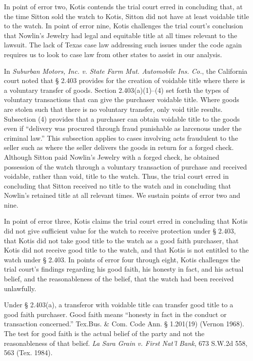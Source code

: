 In point of error two, Kotis contends the trial court erred in concluding that,
at the time Sitton sold the watch to Kotis, Sitton did not have at least
voidable title to the watch. In point of error nine, Kotis challenges the trial
court's conclusion that Nowlin's Jewelry had legal and equitable title at all
times relevant to the lawsuit. The lack of Texas case law addressing such
issues under the code again requires us to look to case law from other states
to assist in our analysis.

In \textit{Suburban Motors, Inc. v. State Farm Mut. Automobile Ins. Co.}, the
California court noted that {\S} 2.403 provides for the creation of voidable
title where there is a voluntary transfer of goods. Section 2.403(a)(1)--(4) set
forth the types of voluntary transactions that can give the purchaser voidable
title. Where goods are stolen such that there is no voluntary transfer, only
void title results. Subsection (4) provides that a purchaser can obtain
voidable title to the goods even if ``delivery was procured through fraud
punishable as larcenous under the criminal law.'' This subsection applies to
cases involving acts fraudulent to the seller such as where the seller delivers
the goods in return for a forged check. Although Sitton paid Nowlin's Jewelry
with a forged check, he obtained possession of the watch through a voluntary
transaction of purchase and received voidable, rather than void, title to the
watch. Thus, the trial court erred in concluding that Sitton received no title
to the watch and in concluding that Nowlin's retained title at all relevant
times. We sustain points of error two and nine.

In point of error three, Kotis claims the trial court erred in concluding that
Kotis did not give sufficient value for the watch to receive protection under
{\S} 2.403, that Kotis did not take good title to the watch as a good faith
purchaser, that Kotis did not receive good title to the watch, and that Kotis
is not entitled to the watch under {\S} 2.403. In points of error four through
eight, Kotis challenges the trial court's findings regarding his good faith,
his honesty in fact, and his actual belief, and the reasonableness of the
belief, that the watch had been received unlawfully.

Under {\S} 2.403(a), a transferor with voidable title can transfer good title to
a good faith purchaser. Good faith means ``honesty in fact in the conduct or
transaction concerned.'' Tex.Bus. \& Com. Code Ann. {\S} 1.201(19) (Vernon
1968). The test for good faith is the actual belief of the party and not the
reasonableness of that belief. \textit{La Sara Grain v. First Nat'l Bank}, 673
S.W.2d 558, 563 (Tex. 1984).

